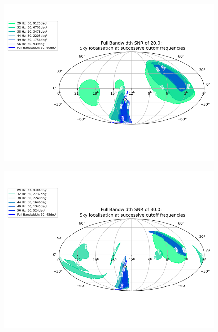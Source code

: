 %
\begin{figure}
    \centering
    \includegraphics[width=\textwidth]{images/6_earlywarning/localisation/20SNR_multiple.png}
    \caption{}
    \label{fig:ew_20SNR_multiple}
\end{figure}
%
\begin{figure}
    \centering
    \includegraphics[width=\textwidth]{images/6_earlywarning/localisation/30SNR_multiple.png}
    \caption{}
    \label{fig:ew_30SNR_multiple}
\end{figure}
%
